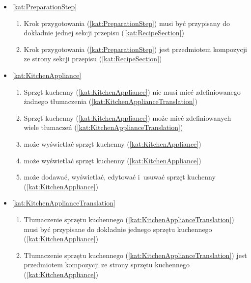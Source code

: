 \begin{itemize}[label={\textbf{Reguły dla}}, wide, labelwidth=!, labelindent=0pt]
\begin{enumerate}[label={\textbf{REG/3/\protect\twodigits{\arabic{enumi}}}}, wide, labelwidth=!, align=left, leftmargin=3cm, resume]
    \end{enumerate}
    \item\ref{kat:PreparationStep}\mynobreakpar
    \begin{enumerate}[label={\textbf{REG/3/\protect\twodigits{\arabic{enumi}}}}, wide, labelwidth=!, align=left, leftmargin=3cm, resume]
        \item Krok przygotowania (\ref{kat:PreparationStep}) musi być przypisany do dokładnie jednej sekcji przepisu (\ref{kat:RecipeSection})
        \item Krok przygotowania (\ref{kat:PreparationStep}) jest przedmiotem kompozycji ze strony sekcji przepisu (\ref{kat:RecipeSection})
    \end{enumerate}
    \item\ref{kat:KitchenAppliance}\mynobreakpar
    \begin{enumerate}[label={\textbf{REG/3/\protect\twodigits{\arabic{enumi}}}}, wide, labelwidth=!, align=left, leftmargin=3cm, resume]
        \item Sprzęt kuchenny (\ref{kat:KitchenAppliance}) nie musi mieć zdefiniowanego żadnego tłumaczenia (\ref{kat:KitchenApplianceTranslation})
        \item Sprzęt kuchenny (\ref{kat:KitchenAppliance}) może mieć zdefiniowanych wiele tłumaczeń (\ref{kat:KitchenApplianceTranslation})
        \item {} może wyświetlać sprzęt kuchenny (\ref{kat:KitchenAppliance})
        \item {} może wyświetlać sprzęt kuchenny (\ref{kat:KitchenAppliance})
        \item {} może dodawać, wyświetlać, edytować i~usuwać sprzęt kuchenny (\ref{kat:KitchenAppliance})
    \end{enumerate}
    \item\ref{kat:KitchenApplianceTranslation}\mynobreakpar
    \begin{enumerate}[label={\textbf{REG/3/\protect\twodigits{\arabic{enumi}}}}, wide, labelwidth=!, align=left, leftmargin=3cm, resume]
        \item Tłumaczenie sprzętu kuchennego (\ref{kat:KitchenApplianceTranslation}) musi być przypisane do dokładnie jednego sprzętu kuchennego (\ref{kat:KitchenAppliance})
        \item Tłumaczenie sprzętu kuchennego (\ref{kat:KitchenApplianceTranslation}) jest przedmiotem kompozycji ze strony sprzętu kuchennego (\ref{kat:KitchenAppliance})

\end{enumerate}
\end{itemize}
